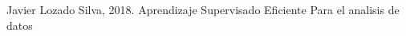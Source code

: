 \documentclass[twoside,twocolumn]{article}
\begin{document}

\begin{thebibliography}{99} 

\bibitem[1]{}
\newblock Javier Lozado Silva, 2018. Aprendizaje Supervisado Eficiente
Para el analisis de datos 
 



\end{thebibliography}


\end{document}
